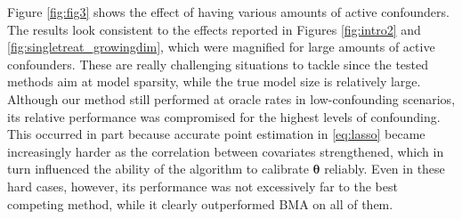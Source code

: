 \documentclass[12pt]{article}
\newcommand{\btheta}{{\bm{\theta}}}
\begin{document}
Figure \ref{fig:fig3} shows the effect of having various amounts of active confounders. The results look consistent to the effects reported in Figures \ref{fig:intro2} and \ref{fig:singletreat_growingdim}, which were magnified for large amounts of active confounders. These are really challenging situations to tackle since the tested methods aim at model sparsity, while the true model size is relatively large. Although our method still performed at oracle rates in low-confounding scenarios, its relative performance was compromised for the highest levels of confounding. This occurred in part because accurate point estimation in \eqref{eq:lasso} became increasingly harder as the correlation between covariates strengthened, which in turn influenced the ability of the algorithm to calibrate $\btheta$ reliably. Even in these hard cases, however, its performance was not excessively far to the best competing method, while it clearly outperformed BMA on all of them.






%


%

\end{document}
